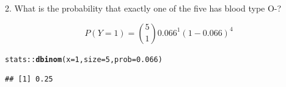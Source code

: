 \documentclass[10pt,handout]{beamer}\usepackage[]{graphicx}\usepackage[]{color}
\makeatletter
\newcommand{\hlnum}[1]{\textcolor[rgb]{0.686,0.059,0.569}{#1}}%
\newcommand{\hlopt}[1]{\textcolor[rgb]{0,0,0}{#1}}%
\newcommand{\hlstd}[1]{\textcolor[rgb]{0.345,0.345,0.345}{#1}}%
\newcommand{\hlkwc}[1]{\textcolor[rgb]{0.333,0.667,0.333}{#1}}%
\newcommand{\hlkwd}[1]{\textcolor[rgb]{0.737,0.353,0.396}{\textbf{#1}}}%
\newenvironment{kframe}{%
 \def\at@end@of@kframe{}%
 \ifinner\ifhmode%
  \def\at@end@of@kframe{\end{minipage}}%
  \begin{minipage}{\columnwidth}%
 \fi\fi%
 \def\FrameCommand##1{\hskip\@totalleftmargin \hskip-\fboxsep
 \colorbox{shadecolor}{##1}\hskip-\fboxsep
     \hskip-\linewidth \hskip-\@totalleftmargin \hskip\columnwidth}%
 \MakeFramed {\advance\hsize-\width
   \@totalleftmargin\z@ \linewidth\hsize
   \@setminipage}}%
 {\par\unskip\endMakeFramed%
 \at@end@of@kframe}
\newenvironment{knitrout}{}{} %
\makeatother
\begin{document}
\begin{frame}[fragile]{2. What is the probability that exactly one of the five has blood type O-?}
	
	$$ 
	P(Y = 1) = \binom{5}{1} 0.066^1 (1- 0.066)^4
	$$
	
	
\begin{knitrout}\tiny
{}\color{fgcolor}\begin{kframe}
\begin{alltt}
\hlstd{stats}\hlopt{::}\hlkwd{dbinom}\hlstd{(}\hlkwc{x} \hlstd{=} \hlnum{1}\hlstd{,} \hlkwc{size} \hlstd{=} \hlnum{5}\hlstd{,} \hlkwc{prob} \hlstd{=} \hlnum{0.066}\hlstd{)}
\end{alltt}
\begin{verbatim}
## [1] 0.25
\end{verbatim}
\end{kframe}
\end{knitrout}
	
\end{frame}
\end{document}

